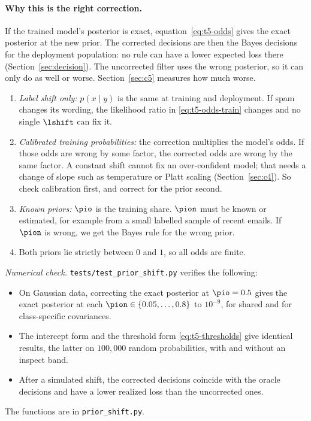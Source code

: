 \paragraph{Why this is the right correction.}
If the trained model's posterior is exact, equation~\eqref{eq:t5-odds} gives the exact posterior at the new
prior. The corrected decisions are then the Bayes decisions for the deployment population: no rule can have
a lower expected loss there (Section~\ref{sec:decision}). The uncorrected filter uses the wrong posterior, so
it can only do as well or worse. Section~\ref{sec:c5} measures how much worse.

\begin{assumptions}
\begin{enumerate}[label=(\roman*),itemsep=1pt,topsep=2pt]
  \item \emph{Label shift only:} $p(x\mid y)$ is the same at training and deployment. If spam changes its
        wording, the likelihood ratio in \eqref{eq:t5-odds-train} changes and no single $\lshift$ can fix it.
  \item \emph{Calibrated training probabilities:} the correction multiplies the model's odds. If those odds
        are wrong by some factor, the corrected odds are wrong by the same factor. A constant shift cannot
        fix an over-confident model; that needs a change of slope such as temperature or Platt scaling
        (Section~\ref{sec:c4}). So check calibration first, and correct for the prior second.
  \item \emph{Known priors:} $\pio$ is the training share. $\pion$ must be known or estimated, for example
        from a small labelled sample of recent emails. If $\pion$ is wrong, we get the Bayes rule for the
        wrong prior.
  \item Both priors lie strictly between $0$ and $1$, so all odds are finite.
\end{enumerate}
\end{assumptions}

\medskip\noindent\emph{Numerical check.} \texttt{tests/test\_prior\_shift.py} verifies the following:
\begin{itemize}[itemsep=1pt,topsep=2pt]
  \item On Gaussian data, correcting the exact posterior at $\pio=0.5$ gives the exact posterior at each
        $\pion\in\{0.05,\dots,0.8\}$ to $10^{-9}$, for shared and for class-specific covariances.
  \item The intercept form and the threshold form \eqref{eq:t5-thresholds} give identical results, the latter
        on $100{,}000$ random probabilities, with and without an inspect band.
  \item After a simulated shift, the corrected decisions coincide with the oracle decisions and have a lower
        realized loss than the uncorrected ones.
\end{itemize}
The functions are in \texttt{prior\_shift.py}.


